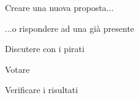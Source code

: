 \documentclass{beamer}
\begin{document}
\begin{frame}{Creare una nuova proposta... }
\end{frame}

\begin{frame}{...o rispondere ad una gi\`a presente}
\end{frame}

\begin{frame}{Discutere con i pirati}
\end{frame}

\begin{frame}{Votare}
\end{frame}

\begin{frame}{Verificare i risultati}
\end{frame}
\end{document}
